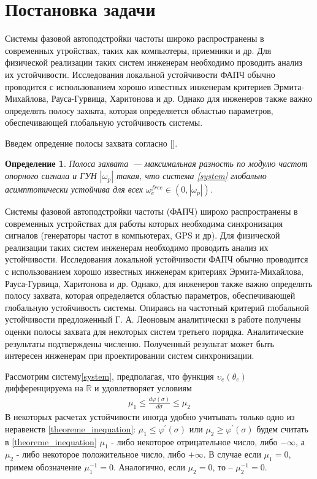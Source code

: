 \documentclass[a4paper,14pt]{article} %
\newtheorem{definition}{Определение}
\begin{document}
\newpage
\section{Постановка задачи}
Системы фазовой автоподстройки частоты широко распространены в современных утройствах, таких как компьютеры, приемники и др. Для физической реализации таких систем инженерам необходимо проводить анализ их устойчивости. Исследования локальной устойчивости ФАПЧ обычно проводится с использованием хорошо известных инженерам критериев Эрмита-Михайлова, Рауса-Гурвица, Харитонова и др. Однако для инженеров также важно определять полосу захвата, которая определяется областью параметров, обеспечивающей глобальную устойчивость системы.

Введем опредение полосы захвата согласно [].
\begin{definition}
Полоса захвата~--- максимальная разность по модулю частот опорного сигнала и ГУН $|\omega_p|$ такая, что система \eqref{system} глобально асимптотически устойчива для всех $\omega_e^{free} \in (0, |\omega_p|)$.
\end{definition}

Системы фазовой автоподстройки частоты (ФАПЧ) широко распространены в современных устройствах для работы которых необходима синхронизация сигналов (генераторы частот в компьютерах, GPS и др).  Для физической реализации таких систем инженерам необходимо проводить анализ их устойчивости. Исследования локальной устойчивости ФАПЧ обычно проводится с использованием хорошо известных инженерам критериях Эрмита-Михайлова, Рауса-Гурвица, Харитонова и др. Однако, для инженеров также важно определять полосу захвата, которая определяется областью параметров, обеспечивающей глобальную устойчивость системы. Опираясь на частотный критерий глобальной устойчивости предложенный Г. А. Леоновым аналитически в работе получены оценки полосы захвата для некоторых систем третьего порядка. Аналитические результаты подтверждены численно. Полученный результат может быть интересен инженерам при проектировании систем синхронизации.

Рассмотрим систему\eqref{system}, предполагая, что функция $\upsilon_e(\theta_e)$ дифференцируема на $\mathbb {R}$ и удовлетворяет условиям
 \begin{equation}\label{theoreme_inequation}
 \begin{aligned}
\mu_1 \leqslant \frac{d\varphi(\sigma)}{d\sigma} \leqslant \mu_2
 \end{aligned}
\end{equation}
В некоторых расчетах устойчивости иногда удобно учитывать только одно из неравенств \eqref{theoreme_inequation}: $\mu_1 \leqslant \varphi^\prime(\sigma)$ или $\mu_2 \geqslant \varphi^\prime(\sigma)$ будем считать в \eqref{theoreme_inequation} $\mu_1$ - либо некоторое отрицательное число, либо $-\infty$, а $\mu_2$ - либо некоторое положительное число, либо $+\infty$. В случае если $\mu_1 = 0$, примем обозначение $\mu_1^{-1} = 0$. Аналогично, если $\mu_2 = 0$, то -- $\mu_2^{-1} = 0$.
\end{document}

